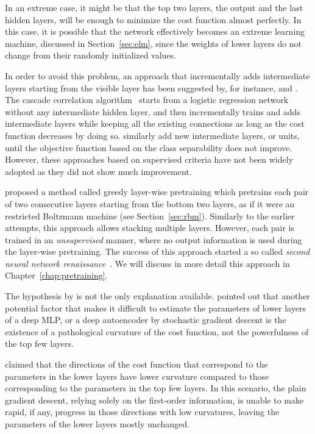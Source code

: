 \documentclass{now}
\begin{document}
In an extreme case, it might be that the top two layers, the output and the last
hidden layers, will be enough to minimize the cost function almost perfectly. In
this case, it is possible that the network effectively becomes an extreme
learning machine, discussed in Section~\ref{sec:elm}, since the weights of lower
layers do not change from their randomly initialized values. 

In order to avoid this problem, an approach that incrementally adds intermediate
layers starting from the visible layer has been suggested by, for instance,
\citet{Fahlman1990} and \citet{Lengelle1996}.  The cascade correlation
algorithm~\citep{Fahlman1990} starts from a logistic regression network without
any intermediate hidden layer, and then incrementally trains and adds
intermediate layers while keeping all the existing connections as long as the
cost function decreases by doing so. \citet{Lengelle1996} similarly add new
intermediate layers, or units, until the objective function based on the class
separability does not improve.  However, these approaches based on supervised
criteria have not been widely adopted as they did not show much improvement.

\citet{Hinton2006} proposed a method called greedy layer-wise pretraining which
pretrains each pair of two consecutive layers starting from the bottom two
layers, as if it were an restricted Boltzmann machine (see
Section~\ref{sec:rbm}). Similarly to the earlier attempts, this approach allows
stacking multiple layers. However, each pair is trained in an
\textit{unsupervised} manner, where no output information is used during the
layer-wise pretraining. The success of this approach started a so called
\textit{second neural network renaissance}~\citep{Schmidhuber2011}.  We will
discuss in more detail this approach in Chapter~\ref{chap:pretraining}.

The hypothesis by \citet{Bengio2007nips} is not the only explanation available.
\citet{Martens2010} pointed out that another potential factor that makes it
difficult to estimate the parameters of lower layers of a deep MLP, or a deep
autoencoder by stochastic gradient descent is the existence of a pathological
curvature of the cost function, not the powerfulness of the top few layers. 

\citet{Martens2010} claimed that the directions of the cost function that
correspond to the parameters in the lower layers have lower curvature compared
to those corresponding to the parameters in the top few layers. In this
scenario, the plain gradient descent, relying solely on the first-order
information, is unable to make rapid, if any, progress in those directions with
low curvatures, leaving the parameters of the lower layers mostly unchanged.
\end{document}
